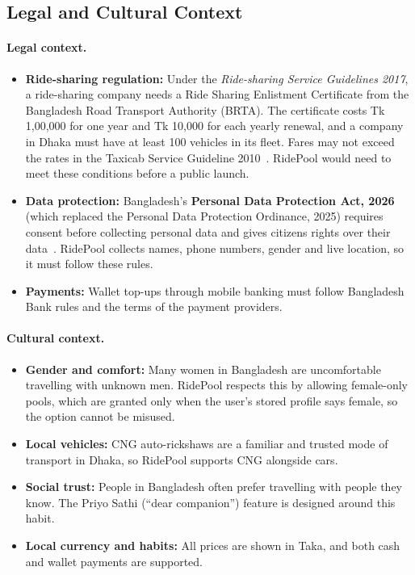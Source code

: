 \subsection{Legal and Cultural Context}

\paragraph{Legal context.}
\begin{itemize}
  \item \textbf{Ride-sharing regulation:} Under the \textit{Ride-sharing
        Service Guidelines 2017}, a ride-sharing company needs a Ride Sharing
        Enlistment Certificate from the Bangladesh Road Transport Authority
        (BRTA). The certificate costs Tk 1,00,000 for one year and Tk 10,000
        for each yearly renewal, and a company in Dhaka must have at least 100
        vehicles in its fleet. Fares may not exceed the rates in the Taxicab
        Service Guideline 2010~\cite{rideshare_guideline}. RidePool would need
        to meet these conditions before a public launch.
  \item \textbf{Data protection:} Bangladesh's \textbf{Personal Data Protection
        Act, 2026} (which replaced the Personal Data Protection Ordinance,
        2025) requires consent before collecting personal data and gives
        citizens rights over their data~\cite{pdpo_2025,pdpa_2026}. RidePool
        collects names, phone numbers, gender and live location, so it must
        follow these rules.
  \item \textbf{Payments:} Wallet top-ups through mobile banking must follow
        Bangladesh Bank rules and the terms of the payment providers.
\end{itemize}

\paragraph{Cultural context.}
\begin{itemize}
  \item \textbf{Gender and comfort:} Many women in Bangladesh are uncomfortable
        travelling with unknown men. RidePool respects this by allowing
        female-only pools, which are granted only when the user's stored
        profile says female, so the option cannot be misused.
  \item \textbf{Local vehicles:} CNG auto-rickshaws are a familiar and trusted
        mode of transport in Dhaka, so RidePool supports CNG alongside cars.
  \item \textbf{Social trust:} People in Bangladesh often prefer travelling
        with people they know. The Priyo Sathi (``dear companion'') feature is
        designed around this habit.
  \item \textbf{Local currency and habits:} All prices are shown in Taka, and
        both cash and wallet payments are supported.
\end{itemize}

